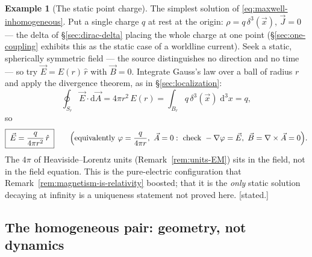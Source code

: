 \documentclass[11pt]{article}
\theoremstyle{plain}
\theoremstyle{definition}
\newtheorem{example}[theorem]{Example}
\theoremstyle{remark}
\newcommand{\dd}{\mathrm{d}}
\newcommand{\vx}{\vec{x}}
\newcommand{\vE}{\vec{E}}
\newcommand{\vB}{\vec{B}}
\begin{document}
\begin{example}[The static point charge]\label{ex:coulomb}
The simplest solution of \eqref{eq:maxwell-inhomogeneous}. Put a single
charge $q$ at rest at the origin: $\rho = q\,\delta^3(\vx)$,
$\vec J = 0$ --- the delta of \S\ref{sec:dirac-delta} placing the whole
charge at one point (\S\ref{sec:one-coupling} exhibits this as the
static case of a worldline current). Seek a static, spherically
symmetric field --- the source distinguishes no direction and no time
--- so try $\vE = E(r)\,\hat r$ with $\vB = 0$. Integrate Gauss's law
over a ball of radius $r$ and apply the divergence theorem, as in
\S\ref{sec:localization}:
\begin{equation}
  \oint_{S_r} \vE\cdot\dd\vec A
  = 4\pi r^2\,E(r)
  = \int_{B_r} q\,\delta^3(\vx)\;\dd^3x
  = q ,
\end{equation}
so
\begin{equation}
  \boxed{\;
  \vE = \frac{q}{4\pi r^2}\,\hat r
  \;}
  \qquad
  \Bigl(\text{equivalently } \varphi = \frac{q}{4\pi r},\ \vec A = 0:
  \text{ check } -\nabla\varphi = \vE,\ \vB = \nabla\times\vec A = 0\Bigr).
\end{equation}
The $4\pi$ of Heaviside--Lorentz units (Remark~\ref{rem:units-EM}) sits
in the field, not in the field equation. This is the pure-electric
configuration that Remark~\ref{rem:magnetism-is-relativity} boosted;
that it is the \emph{only} static solution decaying at infinity is a
uniqueness statement not proved here. [stated.]
\end{example}

\subsection{The homogeneous pair: geometry, not dynamics}
\label{sec:bianchi}
\end{document}
